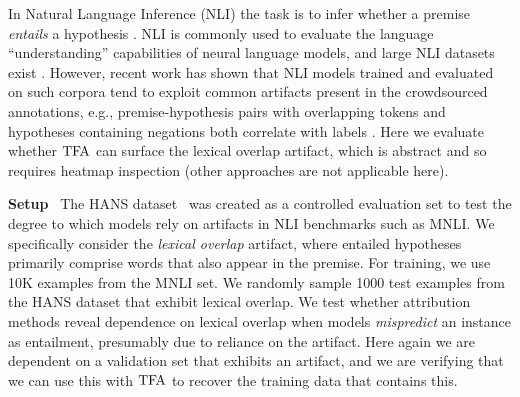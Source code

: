 \documentclass[11pt]{article}
\newcommand\para[1]{\vskip 1mm\noindent\textbf{#1}~}
\begin{document}
In Natural Language Inference (NLI) the task is to infer whether a premise \emph{entails} a  hypothesis \cite{maccartney2009natural}. %
NLI is commonly used to evaluate %
the language ``understanding'' capabilities of neural language models, and large NLI datasets exist \cite{bowman2015large}.
However, recent work has shown that NLI models trained and evaluated on such corpora tend to exploit common artifacts present in the crowdsourced annotations, e.g., premise-hypothesis pairs with overlapping tokens and hypotheses containing negations both correlate with labels \cite{gururangan2018annotation,sanchez-etal-2018-behavior,naik-etal-2018-stress}. 
Here we evaluate whether $\text{TFA}$ can surface the lexical overlap artifact, which is abstract and so requires heatmap inspection (other approaches are not applicable here).

\para{Setup} The HANS dataset~\cite{mccoy2019right} was created as a controlled evaluation set to test %
the degree to which models rely on %
artifacts %
in NLI benchmarks such as MNLI. 
We specifically consider the \emph{lexical overlap} artifact, %
where %
entailed hypotheses primarily comprise words that also appear in the premise. 
For training, we use 10K examples from the MNLI set. %
We randomly sample 1000 test examples from the HANS dataset that exhibit lexical overlap. 
We test whether attribution methods reveal dependence on lexical overlap when models \emph{mispredict} an instance as entailment, presumably due to reliance on the artifact. %
Here again we are dependent on a validation set that exhibits an artifact, and we are verifying that we can use this with $\text{TFA}$ to recover the training data that contains this.
\end{document}
